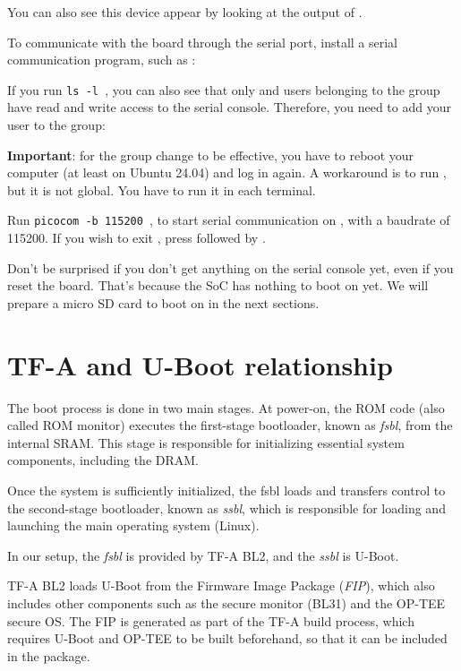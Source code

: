 You can also see this device appear by looking at the output of
.

To communicate with the board through the serial port, install a
serial communication program, such as :


If you run {\tt ls -l \hosttty}, you can also see that only
 and users belonging to the  group have
read and write access to the serial console. Therefore, you need
to add your user to the  group:


{\bf Important}: for the group change to be effective, you have to
reboot your computer (at least on Ubuntu 24.04) and log in again.
A workaround is to run , but it is not global.
You have to run it in each terminal.

Run {\tt picocom -b 115200 \hosttty}, to start serial
communication on {\tt \hosttty}, with a baudrate of 115200.
If you wish to exit , press \code{[Ctrl][a]} followed by
\code{[Ctrl][x]}.

Don't be surprised if you don't get anything on the serial console yet,
even if you reset the board. That's because the SoC has nothing to boot
on yet. We will prepare a micro SD card to boot on in the next sections.

\section{TF-A and U-Boot relationship}

The boot process is done in two main stages. At power-on, the ROM code
(also called ROM monitor) executes the first-stage bootloader, known
as {\em fsbl}, from the internal SRAM. This stage is responsible for
initializing essential system components, including the DRAM.

Once the system is sufficiently initialized, the fsbl loads and
transfers control to the second-stage bootloader, known as {\em ssbl},
which is responsible for loading and launching the main operating
system (Linux).

In our setup, the {\em fsbl} is provided by TF-A BL2, and the {\em
ssbl} is U-Boot.

TF-A BL2 loads U-Boot from the Firmware Image Package ({\em FIP}),
which also includes other components such as the secure monitor (BL31)
and the OP-TEE secure OS. The FIP is generated as part of the TF-A
build process, which requires U-Boot and OP-TEE to be built
beforehand, so that it can be included in the package.

